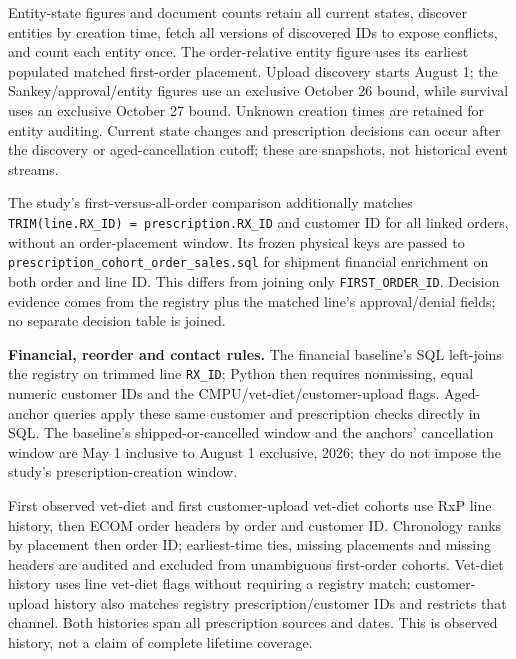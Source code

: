 Entity-state figures and document counts retain all current states, discover
entities by creation time, fetch all versions of discovered IDs to expose
conflicts, and count each entity once. The order-relative entity figure uses
its earliest populated matched first-order placement. Upload discovery starts
August 1; the Sankey/approval/entity figures use an exclusive October 26 bound,
while survival uses an exclusive October 27 bound. Unknown creation times are
retained for entity auditing. Current state changes and prescription decisions
can occur after the discovery or aged-cancellation cutoff; these are snapshots,
not historical event streams.

The study's first-versus-all-order comparison additionally matches
\texttt{TRIM(line.RX\_ID) = prescription.RX\_ID} and customer ID for all linked
orders, without an order-placement window. Its frozen physical keys are passed
to \texttt{prescription\_cohort\_order\_sales.sql} for shipment financial enrichment
on both order and line ID. This differs from joining only
\texttt{FIRST\_ORDER\_ID}. Decision evidence comes from the registry plus the
matched line's approval/denial fields; no separate decision table is joined.

\noindent\textbf{Financial, reorder and contact rules.}
The financial baseline's SQL left-joins the registry on trimmed line
\texttt{RX\_ID}; Python then requires nonmissing, equal numeric customer IDs and
the CMPU/vet-diet/customer-upload flags. Aged-anchor queries apply these same
customer and prescription checks directly in SQL. The baseline's shipped-or-cancelled
window and the anchors' cancellation window are May 1 inclusive to August 1
exclusive, 2026; they do not impose the study's prescription-creation window.

First observed vet-diet and first customer-upload vet-diet cohorts use RxP line
history, then ECOM order headers by order and customer ID. Chronology ranks by
placement then order ID; earliest-time ties, missing placements and missing
headers are audited and excluded from unambiguous first-order cohorts. Vet-diet
history uses line vet-diet flags without requiring a registry match;
customer-upload history also matches registry prescription/customer IDs and
restricts that channel. Both histories span all prescription sources and dates. This is observed
history, not a claim of complete lifetime coverage.






